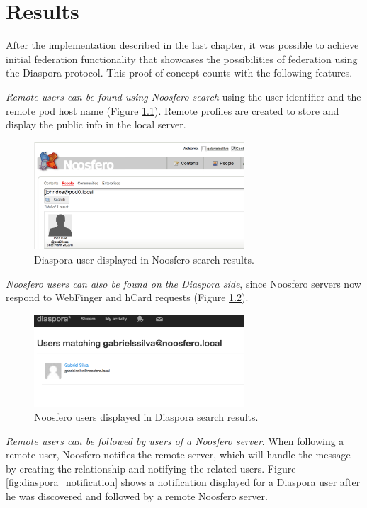 \chapter{Results}
\label{chapter:6}

After the implementation described in the last chapter, it was possible
to achieve initial federation functionality that showcases the
possibilities of federation using the Diaspora protocol. This proof of
concept counts with the following features.

\textit{Remote users can be found using Noosfero search} using the user
identifier and the remote pod host name (Figure
\ref{fig:noosfero_search}). Remote profiles are created to store and
display the public info in the local server.

\begin{figure}[hbt]
  \centering
  \includegraphics[width=0.7\textwidth]{figures/noosfero_search.eps}
  \caption{Diaspora user displayed in Noosfero search results.}
  \label{fig:noosfero_search}
\end{figure}

\textit{Noosfero users can also be found on the Diaspora side}, since Noosfero
servers now respond to WebFinger and hCard requests (Figure
\ref{fig:diaspora_search}).

\begin{figure}[hbt]
  \centering
    \includegraphics[width=0.7\textwidth]{figures/diaspora_search.eps}
  \caption{Noosfero users displayed in Diaspora search results.}
  \label{fig:diaspora_search}
\end{figure}

\textit{Remote users can be followed by users of a Noosfero server}. When
following a remote user, Noosfero notifies the remote server, which will
handle the message by creating the relationship and notifying the
related users. Figure \ref{fig:diaspora_notification} shows a
notification displayed for a Diaspora user after he was discovered and
followed by a remote Noosfero server.


